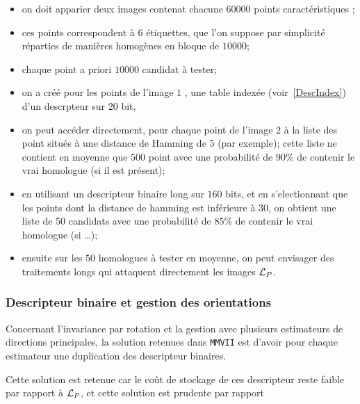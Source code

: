 \begin{itemize}
   \item  on doit apparier deux images contenat chacune $60 000$ points caract\'eristiques ;
   \item  ces points correspondent \`a $6$ \'etiquettes, que l'on suppose par simplicit\'e r\'eparties de
          mani\`eres homog\`enes en bloque de $10000$;

   \item  chaque point a priori $10000$ candidat \`a tester; 
  
   \item  on a  cr\'e\'e pour les points de l'image $1$ , une table index\'ee (voir~\ref{DescIndex}) 
          d'un descrpteur sur $20$ bit,

   \item on peut acc\'eder directement, pour chaque point de l'image $2$ \`a la liste des point situ\'es
         \`a une distance de Hamming de $5$ (par exemple);  cette liste ne contient en moyenne que
         $500$ point avec une probabilit\'e de $90\%$ de contenir le vrai homologue (si il est pr\'esent);
          
   \item en utilisant un descripteur binaire long sur $160$ bits, et en s'electionnant que les points dont
         la distance de hamming est inf\'erieure \`a $30$, on obtient une liste de $50$ candidats 
         avec une probabilit\'e de $85\%$ de contenir le vrai homologue (si \dots);

   \item ensuite sur les $50$ homologues \`a tester en moyenne, on peut envisager des traitements longs
         qui attaquent directement les images ${\mathcal L_P}$.

\end{itemize}


\subsubsection{Descripteur binaire et gestion des orientations}

Concernant l'invariance par rotation et la gestion avec plusieurs estimateurs de directions
principales, la solution retenues dans {\tt MMVII} est d'avoir pour chaque estimateur une
duplication des descripteur binaires.

Cette solution est retenue car le coût de stockage de ces descripteur reste faible par rapport
\`a ${\mathcal L_P}$, et cette solution est prudente par rapport 

